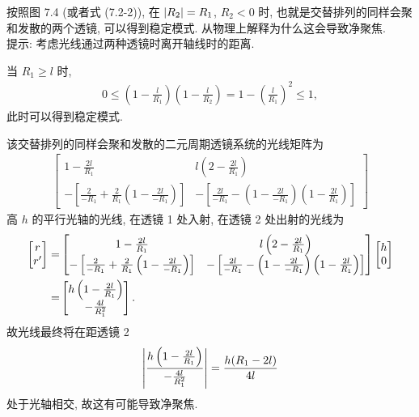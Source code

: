 \documentclass{note}
\begin{document}
\begin{exe}
    按照图 7.4 (或者式 (7.2-2)), 在 $\left\lvert R_2\right\rvert=R_1$, $R_2<0$ 时, 也就是交替排列的同样会聚和发散的两个透镜, 可以得到稳定模式. 从物理上解释为什么这会导致净聚焦.\\
    提示: 考虑光线通过两种透镜时离开轴线时的距离.
\end{exe}
\begin{sol}
    当 $R_1\geq l$ 时,
    \begin{align}
        0\leq\left(1-\frac{l}{R_1}\right)\left(1-\frac{l}{R_2}\right)=1-\left(\frac{l}{R_1}\right)^2\leq 1,
    \end{align}
    此时可以得到稳定模式.

    该交替排列的同样会聚和发散的二元周期透镜系统的光线矩阵为
    \begin{align}
        \begin{bmatrix}
            1-\frac{2l}{R_1}&l\left(2-\frac{2l}{R_1}\right)\\
            -\left[\frac{2}{-R_1}+\frac{2}{R_1}\left(1-\frac{2l}{-R_1}\right)\right]&-\left[\frac{2l}{-R_1}-\left(1-\frac{2l}{-R_1}\right)\left(1-\frac{2l}{R_1}\right)\right]
        \end{bmatrix}
    \end{align}
    高 $h$ 的平行光轴的光线, 在透镜 1 处入射, 在透镜 2 处出射的光线为
    \begin{align}
        \notag\begin{bmatrix}
            r\\
            r'
        \end{bmatrix}=&\begin{bmatrix}
            1-\frac{2l}{R_1}&l\left(2-\frac{2l}{R_1}\right)\\
            -\left[\frac{2}{-R_1}+\frac{2}{R_1}\left(1-\frac{2l}{-R_1}\right)\right]&-\left[\frac{2l}{-R_1}-\left(1-\frac{2l}{-R_1}\right)\left(1-\frac{2l}{R_1}\right)\right]
        \end{bmatrix}\begin{bmatrix}
            h\\
            0
        \end{bmatrix}\\
        =&\begin{bmatrix}
            h\left(1-\frac{2l}{R_1}\right)\\
            -\frac{4l}{R_1^2}
        \end{bmatrix}.
    \end{align}
    故光线最终将在距透镜 2
    \begin{align}
        \left\lvert\frac{h\left(1-\frac{2l}{R_1}\right)}{-\frac{4l}{R_1^2}}\right\rvert=\frac{h(R_1-2l)}{4l}
    \end{align}
    处于光轴相交, 故这有可能导致净聚焦.
\end{sol}
\end{document}
